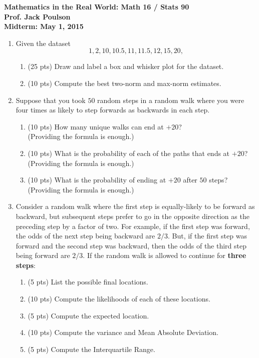 \documentclass[11pt]{article}
\begin{document}
\noindent
{\bf Mathematics in the Real World: Math 16 / Stats 90}\\
{\bf Prof. Jack Poulson}\\
{\bf Midterm: May 1, 2015}\\

\begin{enumerate}

\item
  Given the dataset 
  \[
    1, 2, 10, 10.5, 11, 11.5, 12, 15, 20,
  \]
  \begin{enumerate}
  \item
   (25 pts) Draw and label a box and whisker plot for the dataset.
  \item 
   (10 pts) Compute the best two-norm and max-norm estimates.
  \end{enumerate}

\item 
  Suppose that you took $50$ random steps in a random walk where you were four 
  times as likely to step forwards as backwards in each step.
  \begin{enumerate}
  \item
    (10 pts) How many unique walks can end at $+20$? \\
    (Providing the formula is enough.)
  \item
    (10 pts) What is the probability of each of the paths that ends at $+20$? \\
    (Providing the formula is enough.)
  \item
    (10 pts) What is the probability of ending at $+20$ after $50$ steps? \\
    (Providing the formula is enough.)
  \end{enumerate}

\item
  Consider a random walk where the first step is equally-likely to be forward 
  as backward, but subsequent steps prefer to go in the opposite direction as 
  the preceding step by a factor of two.
  For example, if the first step was forward, the odds of the next step being
  backward are $2/3$. But, if the first step was forward and the second step 
  was backward, then the odds of the third step being forward are $2/3$.
  If the random walk is allowed to continue for {\bf three steps}:
  \begin{enumerate}
  \item (5 pts) List the possible final locations.
  \item (10 pts) Compute the likelihoods of each of these locations.
  \item (5 pts) Compute the expected location.
  \item (10 pts) Compute the variance and Mean Absolute Deviation.
  \item (5 pts) Compute the Interquartile Range.
  \end{enumerate}
\end{enumerate}
\end{document}
